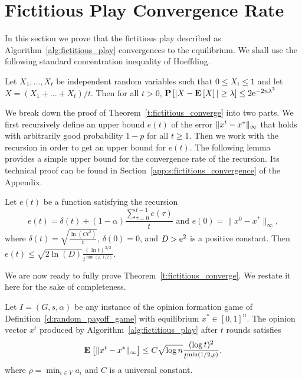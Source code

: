 \section{Fictitious Play Convergence Rate}\label{s:fictitious_convergence}
In this section we prove that the fictitious play described as
Algorithm~\ref{alg:fictitious_play} convergences to the equilibrium.
We shall use the following standard concentration inequality of Hoeffding.
\begin{lemma}\label{l:hoeffding}
  Let $X_1, \ldots, X_t$ be independent random variables such that
  $0 \leq X_i \leq 1$ and let $X = (X_1 + \ldots + X_t) / t$. Then
  for all $t > 0$,
  \(
    \Prob{ |X - \Exp X| \geq \lambda} \leq 2 \me^{-2 n \lambda^2}
  \)
\end{lemma}
We break down the proof of Theorem~\ref{t:fictitious_converge}
into two parts.  We first recursively define an upper bound $e(t)$
of the error $\| x^t - x^* \|_{\infty}$ that holds with arbitrarily
good probability $1-p$ for all $t \geq 1$. Then we work
with the recursion in order to get an upper bound for $e(t)$.
The following lemma provides a simple upper bound for the
convergence rate of the recursion. Its technical proof can
be found in Section~\ref{app:s:fictitious_convergence} of the Appendix.
\begin{lemma}\label{l:recursion_upper_bound}
  Let $e(t)$ be a function satisfying the recursion
  \[
    e(t) =
    \delta(t) + (1-\alpha)\frac{\sum_{\tau=0}^{t-1}e(\tau)}{t}
    \text{ and } e(0)=\|x^0 - x^*\|_{\infty},
  \]
  where \(\delta(t) = \sqrt{\frac{\ln(C t^2)}{t}} \), \(\delta(0) = 0 \),
  and $D > \mathrm{e}^2$ is a positive constant.  Then
  \(
    e(t) \leq
    \sqrt{2 \ln(D)} \frac{(\ln t)^{3/2}}{t^{\min(\rho,\, 1/2)}}.
  \)
\end{lemma}
We are now ready to fully prove Theorem~\ref{t:fictitious_converge}.
We restate it here for the sake of completeness.
\begin{theorem}
  Let $I = (G,s, \alpha)$ be any instance of the opinion formation
  game of Definition~\ref{d:random_payoff_game} with equilibrium
  $x^* \in [0,1]^n$.  The opinion vector $x^t$ produced by
  Algorithm~\ref{alg:fictitious_play} after $t$ rounds satisfies
  \[
    \bm{\mathrm{E}}_{} \left[ \| x^t - x^* \|_{\infty} \right] \leq
    C \sqrt{\log n}\frac{(\log t)^{2}}{t^{\min(1/2,\rho)}},
  \]
  where $\rho = \min_{i \in V} a_i$ and $C$ is a universal constant.
\end{theorem}
